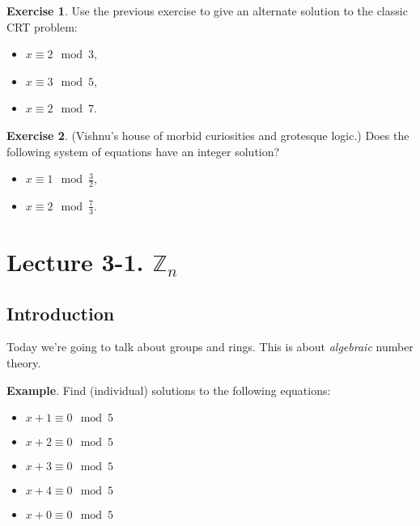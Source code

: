 \documentclass[11pt]{article}
\theoremstyle{definition}
\newtheorem{exercise}{Exercise}
\numberwithin{thm}{section}
\begin{document}
\begin{exercise} Use the previous exercise to give an alternate solution to the classic CRT problem:
\begin{itemize}
	\item $x \equiv 2 \mod 3$,
    \item $x \equiv 3 \mod 5$,
    \item $x \equiv 2 \mod 7$.
\end{itemize}
\end{exercise}

\begin{exercise} (Vishnu's house of morbid curiosities and grotesque logic.) Does the following system of equations have an integer solution?
\begin{itemize}
	\item $x \equiv 1 \mod \frac{3}{2}$,
    \item $x \equiv 2 \mod \frac{7}{3}$.
\end{itemize}
\end{exercise}


\newpage
\section{Lecture 3-1. $\mathbb{Z}_n$}



\subsection{Introduction}

Today we're going to talk about groups and rings. This is about \textit{algebraic} number theory.

\textbf{Example}. Find (individual) solutions to the following equations:

\begin{itemize}
	\item $x + 1 \equiv 0 \mod 5$
    \item $x + 2 \equiv 0 \mod 5$
    \item $x + 3 \equiv 0 \mod 5$
    \item $x + 4 \equiv 0 \mod 5$
    \item $x + 0 \equiv 0 \mod 5$
\end{itemize}
\end{document}
